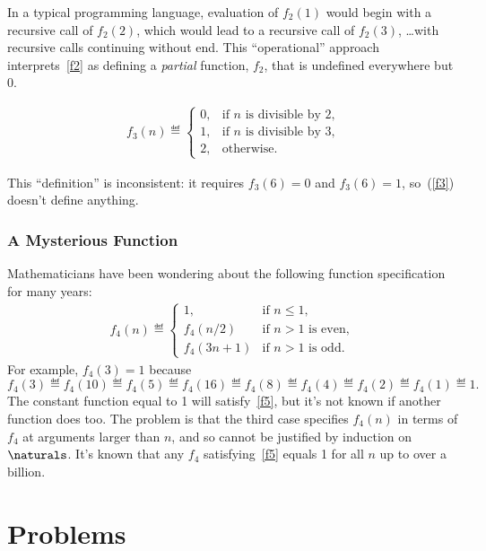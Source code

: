In a typical programming language, evaluation of $f_2(1)$ would begin with
a recursive call of $f_2(2)$, which would lead to a recursive call of
$f_2(3)$, \dots with recursive calls continuing without end.  This
``operational'' approach interprets~\eqref{f2} as defining a
\emph{partial} function, $f_2$, that is undefined everywhere but 0.

\begin{definition}
\begin{eqnarray}\label{f3}
f_3(n) \eqdef \begin{cases}
  0, &  \text{if $n$ is divisible by 2,}\\
  1, &  \text{if $n$ is divisible by 3,}\\
  2, & \text{otherwise.}
 \end{cases}
\end{eqnarray}
\end{definition}
This ``definition'' is inconsistent: it requires $f_3(6) = 0$ and $f_3(6)
=1$, so~(\ref{f3}) doesn't define anything.

\subsubsection{A Mysterious Function}
Mathematicians have been wondering about the following function
specification for many years:
\begin{eqnarray}\label{f5}
f_4(n) \eqdef\begin{cases}
 1, & \text{if $n\le 1$},\\
 f_4(n/2) &  \text{if $n>1$ is even},\\
 f_4(3n+1)& \text{if $n>1$ is odd}.
\end{cases}
\end{eqnarray}
For example, $f_4(3)=1$ because
\[
f_4(3)\eqdef f_4(10)\eqdef f_4(5)\eqdef f_4(16)\eqdef f_4(8)\eqdef
f_4(4)\eqdef f_4(2)\eqdef f_4(1)\eqdef 1.
\]
The constant function equal to 1 will satisfy~\eqref{f5}, but it's not
known if another function does too.  The problem is that the third case
specifies $f_4(n)$ in terms of $f_4$ at arguments larger than $n$, and so
cannot be justified by induction on $\naturals$.  It's known that any
$f_4$ satisfying~\eqref{f5} equals 1 for all $n$ up to over a billion.


\section{Problems}

